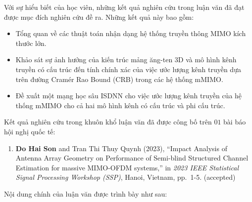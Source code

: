 
Với sự hiểu biết của học viên, những kết quả nghiên cứu trong luận văn đã đạt được mục đích nghiên cứu đề ra. Những kết quả này bao gồm:

\renewcommand{\labelitemi}{$-$}
\begin{itemize}
	\item Tổng quan về các thuật toán nhận dạng hệ thống truyền thông MIMO kích thước lớn.
    \item Khảo sát sự ảnh hưởng của kiến trúc mảng ăng-ten 3D và mô hình kênh truyền có cấu trúc đến tính chính xác của việc ước lượng kênh truyền dựa trên đường Cramér Rao Bound (CRB) trong các hệ thống mMIMO.
    
	\item Đề xuất một mạng học sâu ISDNN cho việc ước lượng kênh truyền của hệ thống mMIMO cho cả hai mô hình kênh có cấu trúc và phi cấu trúc.
\end{itemize} 
\newpage
Kết quả nghiên cứu trong khuôn khổ luận văn đã được công bố trên $01$ bài báo hội nghị quốc tế:
\begin{enumerate}
    \item \textbf{Do Hai Son} and Tran Thi Thuy Quynh (2023), ``Impact Analysis of Antenna Array Geometry on Performance of Semi-blind Structured Channel Estimation for massive MIMO-OFDM systems,'' in \textit{2023 IEEE Statistical Signal Processing Workshop (SSP)}, Hanoi, Vietnam, pp.~1-5. (accepted)
\end{enumerate}

\vspace{0.5cm}

Nội dung chính của luận văn được trình bày như sau:

